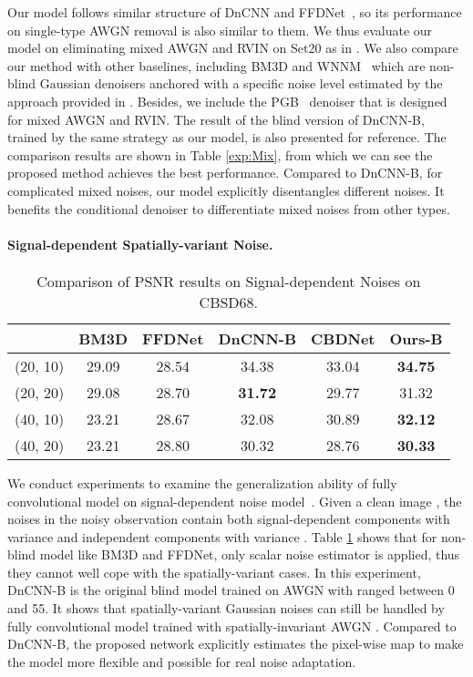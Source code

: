 \documentclass[letterpaper]{article} \usepackage{aaai20}  \usepackage{times}  \usepackage{helvet} \usepackage{courier}  \usepackage{comment}
\begin{document}
Our model follows similar structure of DnCNN and FFDNet~\cite{zhang2018ffdnet}, so its performance on single-type AWGN removal is also similar to them. We thus evaluate our model on eliminating mixed AWGN and RVIN on Set20 as in \cite{xu2016patch}. We also compare our method with other baselines, including BM3D \cite{dabov2006image} and WNNM~\cite{gu2014weighted} which are non-blind Gaussian denoisers anchored with a specific noise level estimated by the approach provided in \cite{liu2013single}. Besides, we include the PGB~\cite{xu2016patch} denoiser that is designed for mixed AWGN and RVIN. The result of the blind version of DnCNN-B, trained by the same strategy as our model, is also presented for reference. The comparison results are shown in Table \ref{exp:Mix}, from which we can see the proposed method achieves the best performance. Compared to DnCNN-B, for complicated mixed noises, our model explicitly disentangles different noises. It benefits the conditional denoiser to differentiate mixed noises from other types. 
\paragraph{Signal-dependent Spatially-variant Noise.}

\begin{table}[t]\setlength{\tabcolsep}{5pt}
\centering
\small
\caption{Comparison of PSNR results on Signal-dependent Noises on CBSD68.}
\begin{tabular}{|c|c|c|c|c|c|}
\hline
 & BM3D &  FFDNet &DnCNN-B & CBDNet &Ours-B\\ \hline 
(20, 10)&29.09&28.54&34.38&33.04&\bf34.75\\
(20, 20)&29.08&28.70&\bf31.72&29.77&31.32\\
(40, 10)&23.21&28.67&32.08&30.89&\bf32.12\\
(40, 20)&23.21&28.80&30.32&28.76&\bf30.33\\
\hline
\end{tabular}
\label{exp:SDN}
\end{table}

We conduct experiments to examine the generalization ability of fully convolutional model on signal-dependent noise model~\cite{guo2018toward,foi2008practical,liu2014practical}. Given a clean image , the noises in the noisy observation  contain both signal-dependent components with variance  and independent components with variance . Table \ref{exp:SDN} shows that for non-blind model like BM3D and FFDNet, only scalar noise estimator \cite{liu2013single} is applied, thus they cannot well cope with the spatially-variant cases. In this experiment, DnCNN-B is the original blind model trained on AWGN with  ranged between 0 and 55. It shows that spatially-variant Gaussian noises can still be handled by fully convolutional model trained with spatially-invariant AWGN \cite{zhang2018ffdnet}. Compared to DnCNN-B, the proposed network explicitly estimates the pixel-wise map to make the model more flexible and possible for real noise adaptation.  
\end{document}
